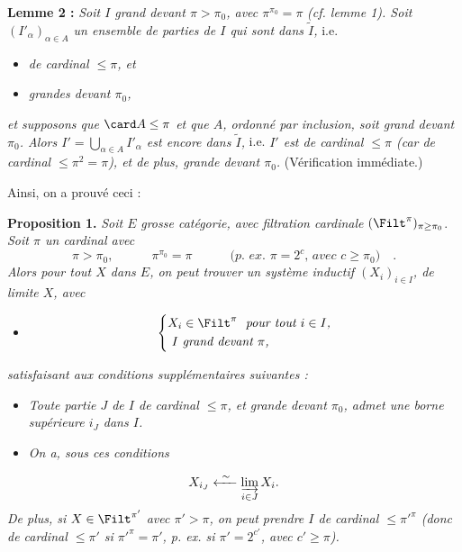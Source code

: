 \textbf{Lemme 2 :} \textit{Soit $I$ grand devant $\pi>\pi_0$, avec $\pi^{\pi_0}=\pi$} \textit{(cf. lemme 1). Soit $(I'_\alpha)_{\alpha\in A}$ un ensemble de parties de $I$ qui sont dans $\tilde I$,} i.e.

\begin{itemize}
\item[a)] \textit{de cardinal $\le\pi$, et}
\item[b)] \textit{grandes devant $\pi_0$,}
\end{itemize}

\textit{et supposons que} $\card A\le\pi$ \textit{et que $A$, ordonné par inclusion, soit grand devant $\pi_0$. Alors $I'=\bigcup_{\alpha\in A} I'_\alpha$ est encore dans $\tilde I$,} i.e. \textit{$I'$ est de cardinal $\le\pi$ (car de cardinal $\le\pi^2=\pi$), et de plus, grande devant $\pi_0$.} (Vérification immédiate.)

Ainsi, on a prouvé ceci :

\textbf{Proposition 1.} \textit{Soit $E$} \textit{grosse catégorie, avec filtration cardinale} $(\Filt^\pi)_{\pi\ge\pi_0}$. \textit{Soit $\pi$ un cardinal avec}
\[
\pi>\pi_0, \qquad\quad \pi^{\pi_0}=\pi \qquad\quad \textit{(p. ex. $\pi=2^c$, avec $c\ge\pi_0$)} \quad .
\]
\textit{Alors pour tout $X$ dans $E$, on peut trouver un système inductif $(X_i)_{i\in I}$, de limite $X$, avec}

\begin{itemize}
\item[a)] \[ \left\{ \begin{aligned} & X_i\in\Filt^\pi \ \ \textit{pour tout $i\in I$,} \\ & \ I \ \textit{grand devant $\pi$,} \end{aligned} \right. \]
\end{itemize}

\textit{satisfaisant aux conditions supplémentaires suivantes :}

\begin{itemize}
\item[b)] \textit{Toute partie $J$ de $I$ de cardinal $\le\pi$, et grande devant $\pi_0$, admet une borne supérieure $i_J$ dans $I$.}
\item[c)] \textit{On a, sous ces conditions}
\end{itemize}

\[
X_{i_J} \xleftarrow{\ \sim\ } \varinjlim_{i\in J} X_i .
\]
\textit{De plus, si $X\in\Filt^{\pi'}$ avec $\pi'>\pi$, on peut prendre $I$ de cardinal $\le\pi'^{\pi}$ (donc de cardinal $\le\pi'$ si $\pi'^{\pi}=\pi'$, p. ex. si $\pi'=2^{c'}$, avec $c'\ge\pi$).}

